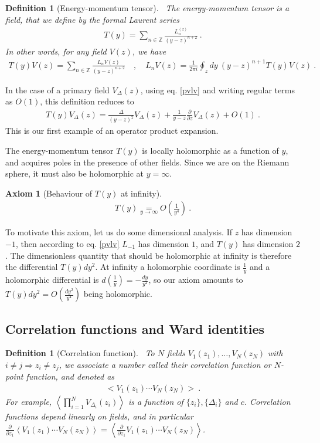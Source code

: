 \documentclass[12pt, a4paper]{article}
\theoremstyle{break}
\newtheorem{hyp}[exo]{Axiom}
\newtheorem{defn}[exo]{Definition}
\begin{document}
\begin{defn}[Energy-momentum tensor]
 ~\label{def:em}
 The energy-momentum tensor is a field, that we define by the formal Laurent series
 \begin{align}
  T(y) = \sum_{n\in\mathbb{Z}} \frac{L_n^{(z)}}{(y-z)^{n+2}} \ .
 \end{align}
In other words, for any field $V(z)$, we have 
\begin{align}
 T(y)V(z) = \sum_{n\in\mathbb{Z}} \frac{L_n V(z)}{(y-z)^{n+2}}\quad , \quad L_n V(z) = \frac{1}{2\pi i} \oint_{z}dy\ (y-z)^{n+1} T(y)V(z)\ .
 \label{eq:lvtv}
\end{align}
\end{defn}
In the case of a primary field $V_\Delta(z)$, using eq. \eqref{pvlv} and writing regular terms as $O(1)$, this definition reduces to
\begin{align}
 T(y)V_\Delta(z) = \frac{\Delta}{(y-z)^2} V_\Delta(z) + \frac{1}{y-z} \frac{\partial}{\partial z} V_\Delta(z) + O(1)\ . 
 \label{eq:tvd}
\end{align}
This is our first example of an operator product expansion.

The energy-momentum tensor $T(y)$ is locally holomorphic as a function of $y$, and acquires poles in the presence of other fields. Since we are on the Riemann sphere, it must also be holomorphic at $y=\infty$. 

\begin{hyp}[Behaviour of $T(y)$ at infinity]
~\label{hyp:ti}
 \begin{align}
 T(y) \underset{y\to\infty} = O\left(\frac{1}{y^4}\right)\ .
 \label{eq:tinf}
\end{align}
\end{hyp}
To motivate this axiom, let us do some dimensional analysis. If $z$ has dimension $-1$, then according to eq. \eqref{pvlv} $L_{-1}$ has dimension $1$, and $T(y)$ has dimension $2$. The dimensionless quantity that should be holomorphic at infinity is therefore the differential $T(y)dy^2$. At infinity a holomorphic coordinate is $\frac{1}{y}$ and a holomorphic differential is $d(\frac{1}{y}) = -\frac{dy}{y^2}$, so our axiom amounts to $T(y)dy^2= O(\frac{dy^2}{y^4})$ being holomorphic.


\subsection{Correlation functions and Ward identities}

\begin{defn}[Correlation function]
~\label{def:cor}
 To $N$ fields $V_1(z_1), \dots ,V_N(z_N)$ with $i\neq j\Rightarrow z_i\neq z_j$, we associate a number called their correlation function or $N$-point function, and denoted as 
 \begin{align}
  \Big< V_1(z_1) \cdots V_N(z_N) \Big>\ .
 \end{align}
For example, $\left< \prod_{i=1}^N V_{\Delta_i}(z_i) \right>$ is a function of $\{z_i\}, \{\Delta_i\}$ and $c$.
Correlation functions depend linearly on fields, and in particular $\frac{\partial}{\partial z_1} \left< V_1(z_1) \cdots V_N(z_N) \right> = \left< \frac{\partial}{\partial z_1}V_1(z_1) \cdots V_N(z_N) \right>$.
\end{defn}
\end{document}
